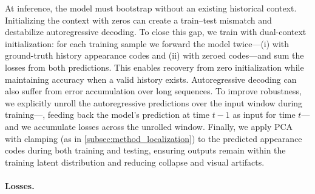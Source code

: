 \documentclass[runningheads]{llncs}
\begin{document}
At inference, the model must bootstrap without an existing historical context.
Initializing the context with zeros can create a train--test mismatch and destabilize autoregressive decoding.
To close this gap, we train with dual-context initialization: for each training sample we forward the model twice---(i) with ground-truth history appearance codes and (ii) with zeroed codes---and sum the losses from both predictions.
This enables recovery from zero initialization while maintaining accuracy when a valid history exists.
Autoregressive decoding can also suffer from error accumulation over long sequences.
To improve robustness, we explicitly unroll the autoregressive predictions over the input window during training---\ie, feeding back the model's prediction at time $t{-}1$ as input for time $t$---and we accumulate losses across the unrolled window.
Finally, we apply PCA with clamping (as in \cref{subsec:method_localization}) to the predicted appearance codes during both training and testing, ensuring outputs remain within the training latent distribution and reducing collapse and visual artifacts.

\paragraph{Losses.}
\end{document}
